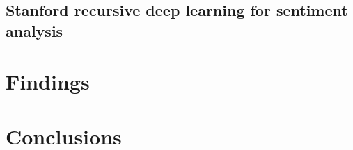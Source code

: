 \documentclass{sig-alternate}
\begin{document}
\subsection{Stanford recursive deep learning for sentiment analysis}

\section{Findings}


\section{Conclusions}



%
%
\end{document}
